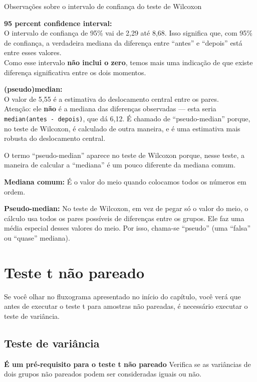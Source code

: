 \documentclass[
]{book}
\begin{document}
Observações sobre o intervalo de confiança do teste de Wilcoxon

\textbf{95 percent confidence interval:}\\
O intervalo de confiança de 95\% vai de 2,29 até 8,68. Isso significa que, com 95\% de confiança, a verdadeira mediana da diferença entre ``antes'' e ``depois'' está entre esses valores.\\
Como esse intervalo \textbf{não inclui o zero}, temos mais uma indicação de que existe diferença significativa entre os dois momentos.

\textbf{(pseudo)median:}\\
O valor de 5,55 é a estimativa do deslocamento central entre os pares.\\
Atenção: ele \textbf{não} é a mediana das diferenças observadas --- esta seria \texttt{median(antes\ -\ depois)}, que dá 6,12. É chamado de ``pseudo-median'' porque, no teste de Wilcoxon, é calculado de outra maneira, e é uma estimativa mais robusta do deslocamento central.

O termo ``pseudo-median'' aparece no teste de Wilcoxon porque, nesse teste, a maneira de calcular a ``mediana'' é um pouco diferente da mediana comum.

\textbf{Mediana comum:} É o valor do meio quando colocamos todos os números em ordem.

\textbf{Pseudo-median:} No teste de Wilcoxon, em vez de pegar só o valor do meio, o cálculo usa todos os pares possíveis de diferenças entre os grupos. Ele faz uma média especial desses valores do meio. Por isso, chama-se ``pseudo'' (uma ``falsa'' ou ``quase'' mediana).

\section{Teste t não pareado}\label{teste-t-nuxe3o-pareado}

Se você olhar no fluxograma apresentado no início do capítulo, você verá que antes de executar o teste t para amostras não pareadas, é necessário executar o teste de variância.

\subsection{Teste de variância}\label{teste-de-variuxe2ncia}

\textbf{É um pré-requisito para o teste t não pareado} Verifica se as variâncias de dois grupos não pareados podem ser consideradas iguais ou não.
\end{document}

